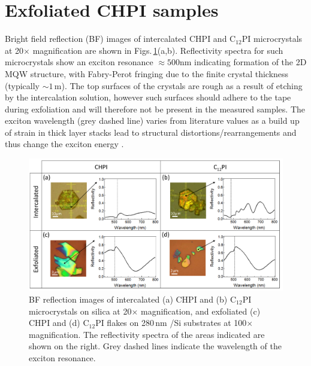 \section{Exfoliated CHPI samples}
Bright field reflection (BF) images of intercalated CHPI and C$_{12}$PI microcrystals at 20$\times$ magnification are shown in Figs.\,\ref{5Fig2}(a,b). Reflectivity spectra for such microcrystals show an exciton resonance $\approx500$nm indicating formation of the 2D MQW structure, with Fabry-Perot fringing due to the finite crystal thickness (typically $\sim1\,$\textmu m). The top surfaces of the crystals are rough as a result of etching by the intercalation solution, however such surfaces should adhere to the tape during exfoliation and will therefore not be present in the measured samples. The exciton wavelength (grey dashed line) varies from literature values as a build up of strain in thick layer stacks lead to structural distortions/rearrangements and thus change the exciton energy \cite{Saikumar2012, VijayaPrakash2009, Pradeesh2009b}. 
\begin{figure}[h!] 
\centering    
\includegraphics[width=\textwidth]{Fig2}
\caption[Intercalated and exfoliated perovskite microcrystals.]{BF reflection images of intercalated (a) CHPI and (b) C$_{12}$PI microcrystals on silica at 20$\times$ magnification, and exfoliated (c) CHPI and (d) C$_{12}$PI flakes on 280\,nm /Si substrates at 100$\times$ magnification. The reflectivity spectra of the areas indicated are shown on the right. Grey dashed lines indicate the wavelength of the exciton resonance.}
\label{5Fig2}
\end{figure}


